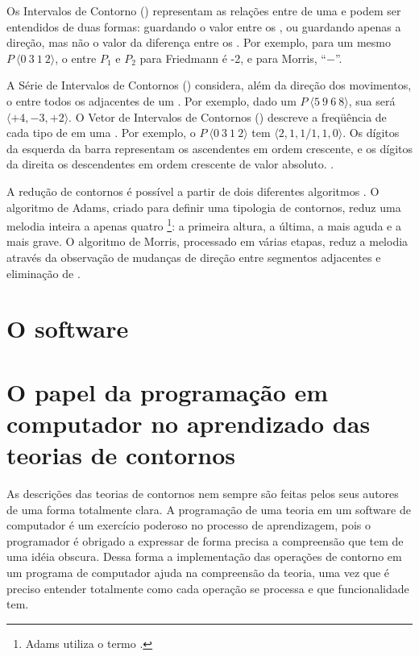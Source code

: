 Os Intervalos de Contorno () representam as relações entre
 de uma  e podem ser entendidos de duas
formas: guardando o valor entre os 
\cite{friedmann85:methodology}, ou guardando apenas a direção, mas não
o valor da diferença entre os 
\cite{morris93:directions}. Por exemplo, para um mesmo 
$P\:\langle0\:3\:1\:2\rangle$, o  entre $P_1$ e $P_2$ para
Friedmann é -2, e para Morris, ``$-$''.

A Série de Intervalos de Contornos () considera, além da
direção dos movimentos, o  entre todos os 
adjacentes de um . Por exemplo, dado um 
$P\:\langle5\:9\:6\:8\rangle$, sua  será
$\langle+4,-3,+2\rangle$. O Vetor de Intervalos de Contornos
() descreve a freqüência de cada tipo de  em uma
. Por exemplo, o  $P\:\langle0\:3\:1\:2\rangle$
tem  $\langle2,1,1/1,1,0\rangle$. Os dígitos da esquerda da
barra representam os  ascendentes em ordem crescente, e os
dígitos da direita os  descendentes em ordem crescente de
valor absoluto. \cite{friedmann85:methodology}.


A redução de contornos é possível a partir de dois diferentes
algoritmos \cite{adams76:melodic,morris93:directions}. O algoritmo de
Adams, criado para definir uma tipologia de contornos, reduz uma
melodia inteira a apenas quatro \footnote{Adams utiliza
  o termo .}: a primeira altura, a última, a
mais aguda e a mais grave. O algoritmo de Morris, processado em várias
etapas, reduz a melodia através da observação de mudanças de direção
entre segmentos adjacentes e eliminação de .

\section{O software}
\label{sec:o-software}

\section{O papel da programação em computador no aprendizado das
  teorias de contornos}
\label{sec:progr-para-compr}

As descrições das teorias de contornos nem sempre são feitas pelos
seus autores de uma forma totalmente clara. A programação de uma
teoria em um software de computador é um exercício poderoso no
processo de aprendizagem, pois o programador é obrigado a expressar de
forma precisa a compreensão que tem de uma idéia obscura. Dessa forma
a implementação das operações de contorno em um programa de computador
ajuda na compreensão da teoria, uma vez que é preciso entender
totalmente como cada operação se processa e que funcionalidade tem.

